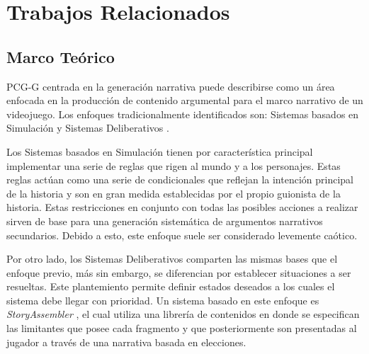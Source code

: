 \chapter{Trabajos Relacionados}



\section{Marco Teórico}

\ac{PCG-G} centrada en la generación narrativa puede describirse como un área enfocada en la producción de contenido argumental para el marco narrativo de un videojuego. Los enfoques tradicionalmente identificados son: Sistemas basados en Simulación y Sistemas Deliberativos \cite{garbe2019storyassembler}.

Los Sistemas basados en Simulación tienen por característica principal implementar una serie de reglas que rigen al mundo y a los personajes. Estas reglas actúan como una serie de condicionales que reflejan la intención principal de la historia y son en gran medida establecidas por el propio guionista de la historia. Estas restricciones en conjunto con todas las posibles acciones a realizar sirven de base para una generación sistemática de argumentos narrativos secundarios. Debido a esto, este enfoque suele ser considerado levemente caótico.

Por otro lado, los Sistemas Deliberativos comparten las mismas bases que el enfoque previo, más sin embargo, se diferencian por establecer situaciones a ser resueltas. Este plantemiento permite definir estados deseados a los cuales el sistema debe llegar con prioridad. Un sistema basado en este enfoque es \textit{StoryAssembler} \cite{garbe2019storyassembler}, el cual utiliza una librería de contenidos en donde se especifican las limitantes que posee cada fragmento y que posteriormente son presentadas al jugador a través de una narrativa basada en elecciones. 

